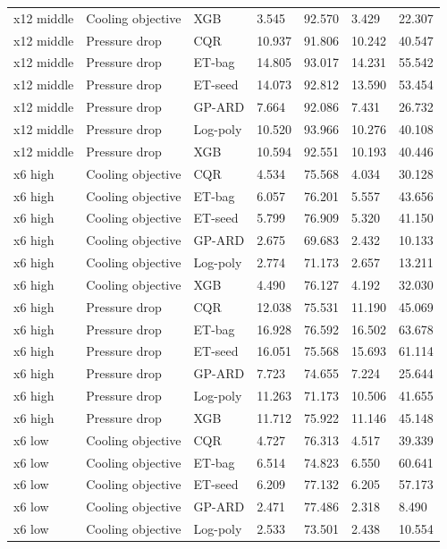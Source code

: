 \begin{longtable}{lllllll}
x12 middle & Cooling objective & XGB & 3.545 & 92.570 & 3.429 & 22.307\\
x12 middle & Pressure drop & CQR & 10.937 & 91.806 & 10.242 & 40.547\\
x12 middle & Pressure drop & ET-bag & 14.805 & 93.017 & 14.231 & 55.542\\
x12 middle & Pressure drop & ET-seed & 14.073 & 92.812 & 13.590 & 53.454\\
x12 middle & Pressure drop & GP-ARD & 7.664 & 92.086 & 7.431 & 26.732\\
x12 middle & Pressure drop & Log-poly & 10.520 & 93.966 & 10.276 & 40.108\\
x12 middle & Pressure drop & XGB & 10.594 & 92.551 & 10.193 & 40.446\\
x6 high & Cooling objective & CQR & 4.534 & 75.568 & 4.034 & 30.128\\
x6 high & Cooling objective & ET-bag & 6.057 & 76.201 & 5.557 & 43.656\\
x6 high & Cooling objective & ET-seed & 5.799 & 76.909 & 5.320 & 41.150\\
x6 high & Cooling objective & GP-ARD & 2.675 & 69.683 & 2.432 & 10.133\\
x6 high & Cooling objective & Log-poly & 2.774 & 71.173 & 2.657 & 13.211\\
x6 high & Cooling objective & XGB & 4.490 & 76.127 & 4.192 & 32.030\\
x6 high & Pressure drop & CQR & 12.038 & 75.531 & 11.190 & 45.069\\
x6 high & Pressure drop & ET-bag & 16.928 & 76.592 & 16.502 & 63.678\\
x6 high & Pressure drop & ET-seed & 16.051 & 75.568 & 15.693 & 61.114\\
x6 high & Pressure drop & GP-ARD & 7.723 & 74.655 & 7.224 & 25.644\\
x6 high & Pressure drop & Log-poly & 11.263 & 71.173 & 10.506 & 41.655\\
x6 high & Pressure drop & XGB & 11.712 & 75.922 & 11.146 & 45.148\\
x6 low & Cooling objective & CQR & 4.727 & 76.313 & 4.517 & 39.339\\
x6 low & Cooling objective & ET-bag & 6.514 & 74.823 & 6.550 & 60.641\\
x6 low & Cooling objective & ET-seed & 6.209 & 77.132 & 6.205 & 57.173\\
x6 low & Cooling objective & GP-ARD & 2.471 & 77.486 & 2.318 & 8.490\\
x6 low & Cooling objective & Log-poly & 2.533 & 73.501 & 2.438 & 10.554\\

\end{longtable}
